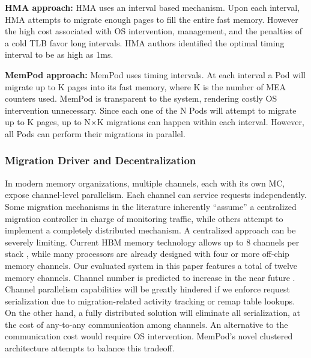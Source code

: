 	\textbf{HMA approach:} HMA uses an interval based mechanism. Upon each interval, HMA attempts to migrate enough pages to fill the entire fast memory. However the high cost associated with OS intervention, management, and the penalties of a cold TLB favor long intervals. HMA authors identified the optimal timing interval to be as high as 1ms.
	
	\textbf{MemPod approach:} MemPod uses timing intervals. At each interval a Pod will migrate up to K pages into its fast memory, where K is the number of MEA counters used. MemPod is transparent to the system, rendering costly OS intervention unnecessary. Since each one of the N Pods will attempt to migrate up to K pages, up to N$\times$K migrations can happen within each interval. However, all Pods can perform their migrations in parallel. %
	

\subsubsection{Migration Driver and Decentralization}





In modern memory organizations, multiple channels, each with its own MC, 
expose channel-level parallelism. Each channel can service requests independently. Some migration mechanisms in the literature inherently ``assume'' a centralized migration controller in charge of monitoring traffic, while others attempt to implement a completely distributed mechanism. A centralized approach can be severely limiting. Current HBM memory technology allows up to 8 channels per stack \cite{JEDEC-HBM-REVISED}, while many processors are already designed with four or more off-chip memory channels. Our evaluated system in this paper features a total of twelve memory channels. Channel number is predicted to increase in the near future \TODO{[cite]}. Channel parallelism capabilities will be greatly hindered if we enforce request serialization due to migration-related activity tracking or remap table lookups. On the other hand, a fully distributed solution will eliminate all serialization, at the cost of any-to-any communication among channels. An alternative to the communication cost would require OS intervention. MemPod's novel clustered architecture attempts to balance this tradeoff. 

